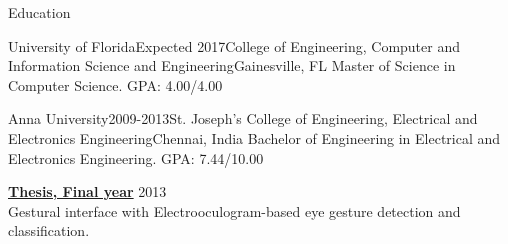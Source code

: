 \documentclass{resume} %
\begin{document}

\begin{rSection}{Education}
\vspace{2mm}

\begin{rSubsection}{University of Florida}{Expected 2017}{College of Engineering, Computer and Information Science and Engineering}{Gainesville, FL}
Master of Science in Computer Science. GPA: 4.00/4.00
\end{rSubsection}

\begin{rSubsection}{Anna University}{2009-2013}{St. Joseph's College of Engineering, Electrical and Electronics Engineering}{Chennai, India}
Bachelor of Engineering in Electrical and Electronics Engineering. GPA: 7.44/10.00
\end{rSubsection}

{\bf {\href{http://onloop.net/hairyplotter/}{Thesis, Final year}}} \hfill {2013} \\
Gestural interface with Electrooculogram-based eye gesture detection and classification.

\end{rSection}

\end{document}

